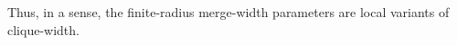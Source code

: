 




\noindent Thus, in a sense, the finite-radius merge-width parameters are local variants of clique-width.













